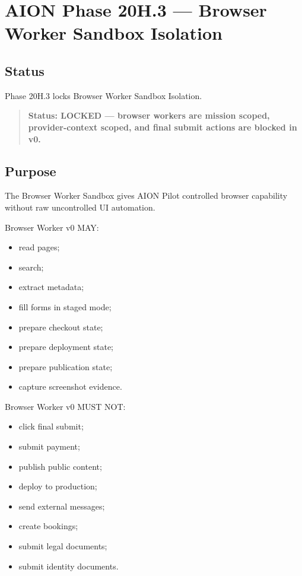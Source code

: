 \section{AION Phase 20H.3 --- Browser Worker Sandbox Isolation}
\label{sec:aion-phase20h3-browser-worker-sandbox-isolation}

\subsection{Status}

Phase 20H.3 locks Browser Worker Sandbox Isolation.

\begin{quote}
\textbf{Status: LOCKED --- browser workers are mission scoped, provider-context scoped, and final submit actions are blocked in v0.}
\end{quote}

\subsection{Purpose}

The Browser Worker Sandbox gives AION Pilot controlled browser capability without raw uncontrolled UI automation.

Browser Worker v0 MAY:

\begin{itemize}
  \item read pages;
  \item search;
  \item extract metadata;
  \item fill forms in staged mode;
  \item prepare checkout state;
  \item prepare deployment state;
  \item prepare publication state;
  \item capture screenshot evidence.
\end{itemize}

Browser Worker v0 MUST NOT:

\begin{itemize}
  \item click final submit;
  \item submit payment;
  \item publish public content;
  \item deploy to production;
  \item send external messages;
  \item create bookings;
  \item submit legal documents;
  \item submit identity documents.
\end{itemize}

